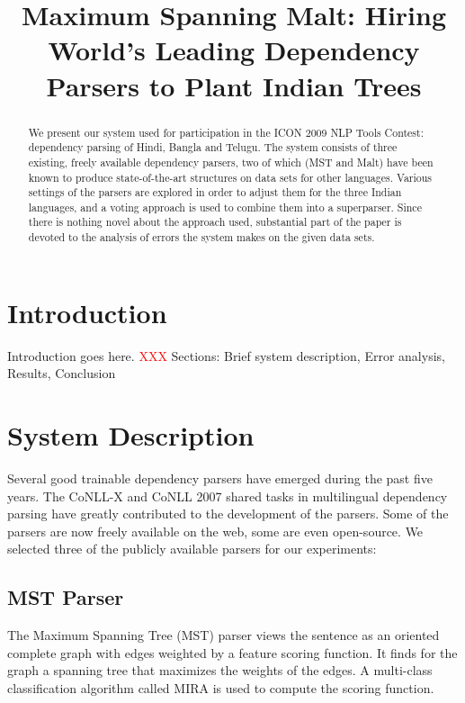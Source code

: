 \documentclass[11pt]{article}
\title{Maximum Spanning Malt: Hiring World's Leading Dependency Parsers to Plant Indian Trees%
}
\author{%
}
\date{}
\newcommand{\XXX}{\textcolor{red}{XXX }} %
\def\microsection#1{{\bf #1.}}
\begin{document}
\maketitle
\thispagestyle{fancy}

\begin{abstract}
We present our system used for participation in the ICON 2009 NLP Tools Contest: dependency parsing of Hindi, Bangla and Telugu. The system consists of three existing, freely available dependency parsers, two of which (MST and Malt) have been known to produce state-of-the-art structures on data sets for other languages. Various settings of the parsers are explored in order to adjust them for the three Indian languages, and a voting approach is used to combine them into a superparser. Since there is nothing novel about the approach used, substantial part of the paper is devoted to the analysis of errors the system makes on the given data sets.
\end{abstract}

\section{Introduction}
\label{sec:intro}

Introduction goes here.
\XXX Sections: Brief system description, Error analysis, Results, Conclusion

\section{System Description}
\label{sec:system}

Several good trainable dependency parsers have emerged during the past five years. The CoNLL-X \citep{buchholz-marsi:2006:CoNLL-X} and CoNLL 2007 \citep{nivre-EtAl:2007:EMNLP-CoNLL2007} shared tasks in multilingual dependency parsing have greatly contributed to the development of the parsers. Some of the parsers are now freely available on the web, some are even open-source. We selected three of the publicly available parsers for our experiments:

\subsection{MST Parser}
\label{sec:mst}
The Maximum Spanning Tree (MST) parser \citep{mst} views the sentence as an oriented complete graph with edges weighted by a feature scoring function. It finds for the graph a spanning tree that maximizes the weights of the edges. A multi-class classification algorithm called MIRA is used to compute the scoring function.
\end{document}
